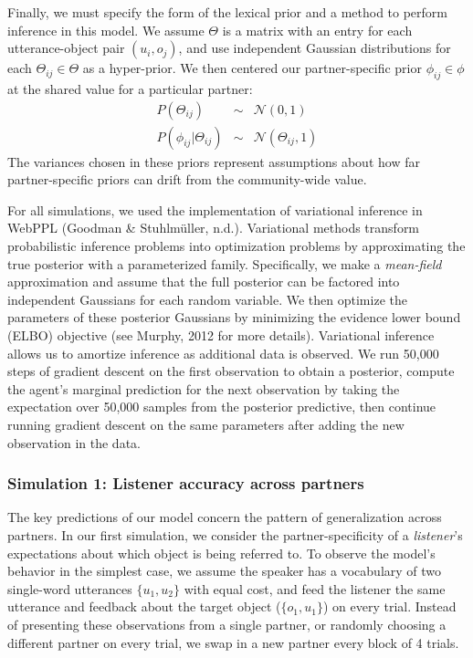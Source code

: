 \documentclass[10pt, letterpaper]{article}
\begin{document}
Finally, we must specify the form of the lexical prior and a method to
perform inference in this model. We assume \(\Theta\) is a matrix with
an entry for each utterance-object pair \((u_i, o_j)\), and use
independent Gaussian distributions for each \(\Theta_{ij} \in \Theta\)
as a hyper-prior. We then centered our partner-specific prior
\(\phi_{ij} \in \phi\) at the shared value for a particular partner:
\[\begin{array}{rcl}
P(\Theta_{ij}) & \sim & \mathcal{N}(0, 1)\\
P(\phi_{ij} | \Theta_{ij}) & \sim & \mathcal{N}(\Theta_{ij}, 1)
\end{array}\] The variances chosen in these priors represent assumptions
about how far partner-specific priors can drift from the community-wide
value.

For all simulations, we used the implementation of variational inference
in WebPPL (Goodman \& Stuhlmüller, n.d.). Variational methods transform
probabilistic inference problems into optimization problems by
approximating the true posterior with a parameterized family.
Specifically, we make a \emph{mean-field} approximation and assume that
the full posterior can be factored into independent Gaussians for each
random variable. We then optimize the parameters of these posterior
Gaussians by minimizing the evidence lower bound (ELBO) objective (see
Murphy, 2012 for more details). Variational inference allows us to
amortize inference as additional data is observed. We run 50,000 steps
of gradient descent on the first observation to obtain a posterior,
compute the agent's marginal prediction for the next observation by
taking the expectation over 50,000 samples from the posterior
predictive, then continue running gradient descent on the same
parameters after adding the new observation in the data.

\hypertarget{simulation-1-listener-accuracy-across-partners}{%
\subsubsection{Simulation 1: Listener accuracy across
partners}\label{simulation-1-listener-accuracy-across-partners}}

The key predictions of our model concern the pattern of generalization
across partners. In our first simulation, we consider the
partner-specificity of a \emph{listener}'s expectations about which
object is being referred to. To observe the model's behavior in the
simplest case, we assume the speaker has a vocabulary of two single-word
utterances \(\{u_1, u_2\}\) with equal cost, and feed the listener the
same utterance and feedback about the target object (\(\{o_1, u_1\}\))
on every trial. Instead of presenting these observations from a single
partner, or randomly choosing a different partner on every trial, we
swap in a new partner every block of 4 trials.
\end{document}
